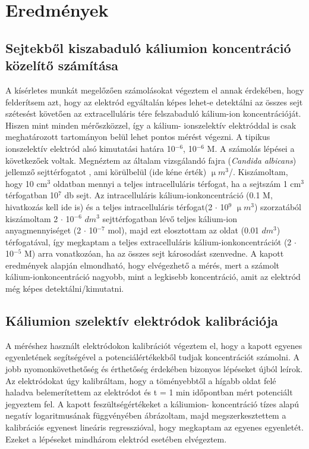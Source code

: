 \chapter{Eredmények}
\pagestyle{headings}


\section{Sejtekből kiszabaduló káliumion koncentráció közelítő számítása}
A kísérletes munkát megelőzően számolásokat végeztem el annak érdekében, hogy felderítsem azt, hogy az elektród egyáltalán képes lehet-e detektálni az összes sejt szétesést követően az extracelluláris tére felszabaduló kálium-ion koncentrációját. Hiszen mint minden mérőszközzel, így a kálium- ionszelektív elektróddal is csak meghatározott tartományon belül lehet pontos mérést végezni. A tipikus ionszelektív elektród alsó kimutatási határa 10$^{-6}$, 10$^{-6}$ M. 
 A számolás lépései a következőek voltak. Megnéztem az általam vizsgálandó fajra (\emph{Candida albicans}) jellemző sejttérfogatot \cite{chaffin1984relationship}, ami körülbelül (ide kéne érték) $\upmu m^3$/. Kiszámoltam, hogy 10 cm$^3$  oldatban mennyi a teljes intracelluláris térfogat, ha a sejtszám 1 cm$^3$ térfogatban 10$^7$ db sejt. Az intracelluláris kálium-ionkoncentráció (0.1 M, hivatkozás kell ide is) és a teljes intracelluláris térfogat(2 $\cdot$ 10$^9$ $\upmu m^3$) szorzatából kiszámoltam 2 $\cdot$ 10$^{-6}$ $dm^3$ sejttérfogatban lévő teljes kálium-ion anyagmennyiséget (2 $\cdot$ 10$^{-7}$ mol), majd ezt elosztottam az oldat (0.01 $dm^3$) térfogatával, így megkaptam a teljes extracelluláris kálium-ionkoncentrációt (2 $\cdot$ 10$^{-5}$ M) arra vonatkozóan, ha az összes sejt károsodást szenvedne. A kapott eredmények alapján elmondható, hogy elvégezhető a mérés, mert a számolt kálium-ionkoncentráció nagyobb, mint a legkisebb koncentráció, amit az elektród még képes detektálni/kimutatni. 

\section{Káliumion szelektív elektródok kalibrációja}
A méréshez használt elektródokon kalibrációt végeztem el, hogy a kapott egyenes egyenletének segítségével a potenciálértékekből tudjak koncentrációt számolni. A jobb nyomonkövethetőség és érthetőség érdekében bizonyos lépéseket újból leírok. Az elektródokat úgy kalibráltam, hogy a töményebbtől a hígabb oldat felé haladva belemerítettem az elektródot és t = 1 min időpontban mért potenciált jegyeztem fel. A kapott feszültségértékeket a káliumion- koncentráció tízes alapú negatív logaritmusának függvényében ábrázoltam, majd megszerkesztettem a kalibrációs egyenest lineáris regresszióval, hogy megkaptam az egyenes egyenletét. Ezeket a lépéseket mindhárom elektród esetében elvégeztem.

